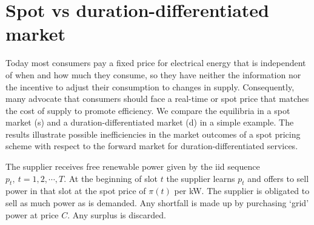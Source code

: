 \documentclass[10pt,draftcls,onecolumn]{IEEEtran}
\newcounter{l1}
\newcounter{l2}
\newcounter{l3}
\begin{document}
\section{Spot vs duration-differentiated market} \label{sec-compare}
Today most consumers pay a fixed price for electrical energy that is independent of when and how much they consume, so they
have neither the information nor the incentive to adjust their consumption to changes in supply.  Consequently, many advocate that consumers should face a real-time or spot price that matches the cost of supply to promote efficiency.  We compare the equilibria in a spot market (s) and a duration-differentiated market (d) in a simple example. The results illustrate possible inefficiencies in the market outcomes of a spot pricing scheme with respect to the forward market for  duration-differentiated services.



The supplier receives free renewable power given by the iid sequence $p_t, \ t=1, 2, \cdots, T$.  At the beginning of slot $t$ the supplier learns $p_t$ and offers to sell power in that slot at the spot price of $\pi(t)$ per kW.  The supplier is obligated to sell as much power as is demanded. Any shortfall is made up by purchasing `grid' power at price $C$.  Any surplus is discarded.
\end{document}

